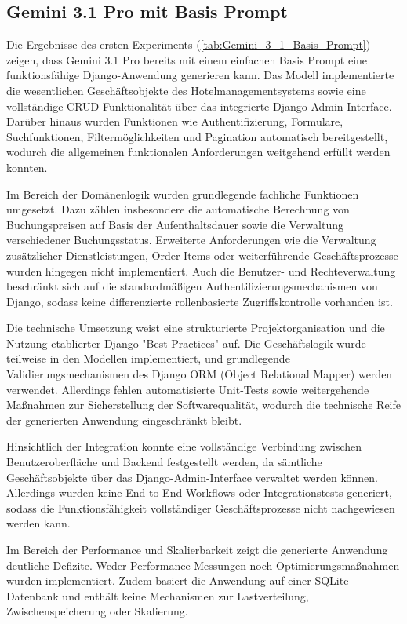 \subsection{Gemini 3.1 Pro mit Basis Prompt}
Die Ergebnisse des ersten Experiments (\ref{tab:Gemini_3_1_Basis_Prompt}) zeigen, dass Gemini 3.1 Pro bereits mit einem einfachen Basis Prompt eine funktionsfähige Django-Anwendung generieren kann. Das Modell implementierte die wesentlichen Geschäftsobjekte des Hotelmanagementsystems sowie eine vollständige CRUD-Funktionalität über das integrierte Django-Admin-Interface. Darüber hinaus wurden Funktionen wie Authentifizierung, Formulare, Suchfunktionen, Filtermöglichkeiten und Pagination automatisch bereitgestellt, wodurch die allgemeinen funktionalen Anforderungen weitgehend erfüllt werden konnten.

Im Bereich der Domänenlogik wurden grundlegende fachliche Funktionen umgesetzt. Dazu zählen insbesondere die automatische Berechnung von Buchungspreisen auf Basis der Aufenthaltsdauer sowie die Verwaltung verschiedener Buchungsstatus. Erweiterte Anforderungen wie die Verwaltung zusätzlicher Dienstleistungen, Order Items oder weiterführende Geschäftsprozesse wurden hingegen nicht implementiert. Auch die Benutzer- und Rechteverwaltung beschränkt sich auf die standardmäßigen Authentifizierungsmechanismen von Django, sodass keine differenzierte rollenbasierte Zugriffskontrolle vorhanden ist.

Die technische Umsetzung weist eine strukturierte Projektorganisation und die Nutzung etablierter Django-"Best-Practices" auf. Die Geschäftslogik wurde teilweise in den Modellen implementiert, und grundlegende Validierungsmechanismen des Django ORM (Object Relational Mapper) werden verwendet. Allerdings fehlen automatisierte Unit-Tests sowie weitergehende Maßnahmen zur Sicherstellung der Softwarequalität, wodurch die technische Reife der generierten Anwendung eingeschränkt bleibt.

Hinsichtlich der Integration konnte eine vollständige Verbindung zwischen Benutzeroberfläche und Backend festgestellt werden, da sämtliche Geschäftsobjekte über das Django-Admin-Interface verwaltet werden können. Allerdings wurden keine End-to-End-Workflows oder Integrationstests generiert, sodass die Funktionsfähigkeit vollständiger Geschäftsprozesse nicht nachgewiesen werden kann.

Im Bereich der Performance und Skalierbarkeit zeigt die generierte Anwendung deutliche Defizite. Weder Performance-Messungen noch Optimierungsmaßnahmen wurden implementiert. Zudem basiert die Anwendung auf einer SQLite-Datenbank und enthält keine Mechanismen zur Lastverteilung, Zwischenspeicherung oder Skalierung.

